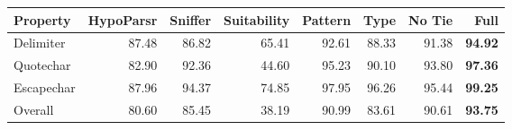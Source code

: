 \begin{tabular}{lrrr|rrrr}
Property & HypoParsr & Sniffer & Suitability & Pattern & Type & No Tie & Full\\
\hline
Delimiter & 87.48 & 86.82 & 65.41 & 92.61 & 88.33 & 91.38 & \textbf{94.92}\\
Quotechar & 82.90 & 92.36 & 44.60 & 95.23 & 90.10 & 93.80 & \textbf{97.36}\\
Escapechar & 87.96 & 94.37 & 74.85 & 97.95 & 96.26 & 95.44 & \textbf{99.25}\\
Overall & 80.60 & 85.45 & 38.19 & 90.99 & 83.61 & 90.61 & \textbf{93.75}\\
\hline
\end{tabular}